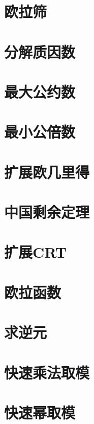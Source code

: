 \section{欧拉筛}
\raggedbottom
\hrulefill
\section{分解质因数}
\raggedbottom
\hrulefill
\section{最大公约数}
\raggedbottom
\hrulefill
\section{最小公倍数}
\raggedbottom
\hrulefill
\section{扩展欧几里得}
\raggedbottom
\hrulefill
\section{中国剩余定理}
\raggedbottom
\hrulefill
\section{扩展CRT}
\raggedbottom
\hrulefill
\section{欧拉函数}
\raggedbottom
\hrulefill
\section{求逆元}
\raggedbottom
\hrulefill
\section{快速乘法取模}
\raggedbottom
\hrulefill
\section{快速幂取模}
\raggedbottom
\hrulefill
